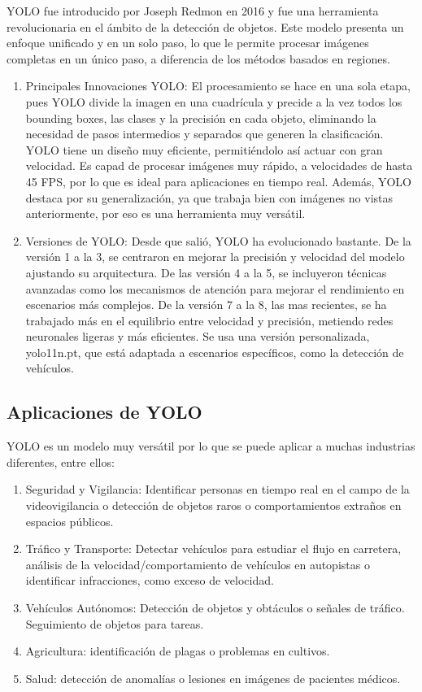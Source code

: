 YOLO fue introducido por Joseph Redmon en 2016 y fue una herramienta revolucionaria en el ámbito de la detección de objetos. Este modelo presenta un enfoque unificado y en un solo paso, lo que le permite procesar imágenes completas en un único paso, a diferencia de los métodos basados en regiones.
\begin{enumerate}
    \item Principales Innovaciones YOLO: El procesamiento se hace en una sola etapa, pues YOLO divide la imagen en una cuadrícula y precide a la vez todos los bounding boxes, las clases y la precisión en cada objeto, eliminando la necesidad de pasos intermedios y separados que generen la clasificación.
    YOLO tiene un diseño muy eficiente, permitiéndolo así actuar con gran velocidad.  Es capad de procesar imágenes muy rápido, a velocidades de hasta 45 FPS, por lo que es ideal para aplicaciones en tiempo real.
    Además, YOLO destaca por su generalización, ya que trabaja bien con imágenes no vistas anteriormente, por eso es una herramienta muy versátil.
    \item Versiones de YOLO: Desde que salió, YOLO ha evolucionado bastante.  De la versión 1 a la 3, se centraron en mejorar la precisión y velocidad del modelo ajustando su arquitectura.  
    De las versión 4 a la 5, se incluyeron técnicas avanzadas como los mecanismos de atención para mejorar el rendimiento en escenarios más complejos.
    De la versión 7 a la 8, las mas recientes, se ha trabajado más en el equilibrio entre velocidad y precisión, metiendo redes neuronales ligeras y más eficientes.  Se usa una versión personalizada, yolo11n.pt, que está adaptada a escenarios específicos, como la detección de vehículos.     
\end{enumerate}

\subsection{Aplicaciones de YOLO}
YOLO es un modelo muy versátil por lo que se puede aplicar a muchas industrias diferentes, entre ellos:

\begin{enumerate}
    \item  Seguridad y Vigilancia: Identificar personas en tiempo real en el campo de la videovigilancia o detección de objetos raros o comportamientos extraños en espacios públicos.
    \item  Tráfico y Transporte: Detectar vehículos para estudiar el flujo en carretera, análisis de la velocidad/comportamiento de vehículos en autopistas o identificar infracciones, como exceso de velocidad.
    \item  Vehículos Autónomos: Detección de objetos y obtáculos o señales de tráfico.  Seguimiento de objetos para tareas.
    \item  Agricultura: identificación de plagas o problemas en cultivos.
    \item  Salud: detección de anomalías o lesiones en imágenes de pacientes médicos.
\end{enumerate}


